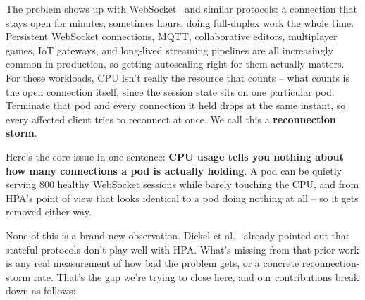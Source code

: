 \documentclass[twocolumn]{svjour3}
\begin{document}
The problem shows up with WebSocket~\cite{websocket_rfc} and similar protocols: a
connection that stays open for minutes, sometimes hours, doing full-duplex work the
whole time. Persistent WebSocket connections, MQTT, collaborative editors,
multiplayer games, IoT gateways, and long-lived streaming pipelines are all
increasingly common in production, so getting autoscaling right for them actually
matters. For these workloads, CPU isn't really the resource that counts --
what counts is the open connection itself, since the session state sits on one
particular pod. Terminate that pod and every connection it held drops at the same
instant, so every affected client tries to reconnect at once. We call this a
\textbf{reconnection storm}.

Here's the core issue in one sentence: \textbf{CPU usage tells you nothing about
how many connections a pod is actually holding}. A pod can be quietly serving 800
healthy WebSocket sessions while barely touching the CPU, and from HPA's point of
view that looks identical to a pod doing nothing at all -- so it gets removed
either way.

None of this is a brand-new observation. Dickel et al.~\cite{dickel2019evaluation}
already pointed out that stateful protocols don't play well with HPA. What's
missing from that prior work is any real measurement of how bad the problem gets, or
a concrete reconnection-storm rate. That's the gap we're trying to close here, and
our contributions break down as follows:
\end{document}
